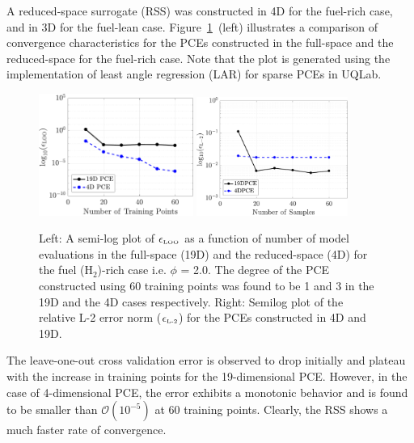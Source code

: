 A reduced-space surrogate (RSS) was constructed in 4D for the fuel-rich case,
and in 3D for
the fuel-lean case. Figure~\ref{fig:err_samples_kinetics}~(left) illustrates a
comparison of convergence characteristics for the PCEs constructed in the
full-space and the reduced-space for the fuel-rich case. Note that the
plot is generated using the implementation of least angle regression (LAR)
for sparse PCEs in UQLab.  
%
\begin{figure}[htbp]
 \begin{center}
  \includegraphics[width=0.45\textwidth]{./Figures/err_samples_kinetics}
   \includegraphics[width=0.44\textwidth]{./Figures/errL2_samples_kinetics}
\caption{Left: A semi-log plot of $\epsilon_\text{\tiny LOO}$ as a function of
number of model evaluations in the full-space (19D) and the reduced-space (4D)
for the fuel (H$_2$)-rich case i.e. $\phi$ = 2.0. The degree of
the PCE constructed using 60 training points was found to be 1 and 3 in the 19D and the 4D cases respectively.
Right: Semilog plot of the relative L-2 error norm ($\epsilon_{\mbox{\tiny{L-2}}}$)
for the PCEs constructed in 4D and 19D.}
\label{fig:err_samples_kinetics}
\end{center}
\end{figure}
%
The leave-one-out cross validation error is observed to drop initially
and plateau with the increase in training points for the 19-dimensional
PCE. However, in the case of 4-dimensional PCE, the error exhibits a
monotonic behavior and is found to be smaller than $\mathcal{O}(10^{-5})$
at 60 training points. Clearly, the RSS shows a much faster rate of convergence.
